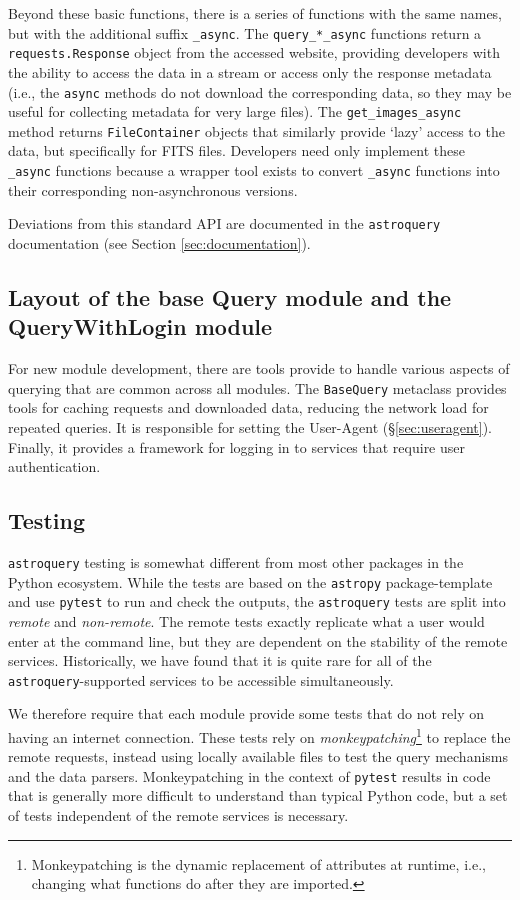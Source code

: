 \documentclass[twocolumn]{aastex61}
\newcommand{\package}[1]{\texttt{#1}\xspace}
\newcommand{\astroquery}{\package{astroquery}}
\newcommand{\astropypkg}{\package{astropy}}
\begin{document}
Beyond these basic functions, there is a series of functions with the same
names, but with the additional suffix \texttt{\_async}.  The
\texttt{query\_*\_async} functions return a \texttt{requests.Response} object
from the accessed website, providing developers with
the ability to access the data in a stream or access only the response
metadata (i.e., the \texttt{async} methods do not download the corresponding
data, so they may be useful for collecting metadata for very large files).  The
\texttt{get\_images\_async} method returns
\texttt{FileContainer} objects that similarly provide `lazy' access to the
data, but specifically for FITS files.  Developers need only implement
these \texttt{\_async} functions because a wrapper tool exists to convert
\texttt{\_async} functions into their corresponding non-asynchronous versions.

Deviations from this standard API are documented in the \astroquery
documentation (see Section \ref{sec:documentation}).

\subsection{Layout of the base Query module and the QueryWithLogin module}
For new module development, there are tools provide to handle various aspects
of querying that are common across all modules.  The \texttt{BaseQuery}
metaclass provides tools for caching requests and downloaded data, reducing the
network load for repeated queries.  It is responsible for setting the
User-Agent (\S \ref{sec:useragent}).  Finally, it provides a framework for
logging in to services that require user authentication.

\subsection{Testing}
\astroquery testing is somewhat different from most other packages in the Python
ecosystem.  While the tests are based on the \astropypkg package-template and use
\package{pytest} to run and check the outputs, the \astroquery tests are split into
\emph{remote} and \emph{non-remote}.  The remote tests exactly replicate what a user
would enter at the command line, but they are dependent on the stability of the
remote services.  Historically, we have found that it is quite rare for all of
the \astroquery-supported services to be accessible simultaneously.

We therefore require that each module provide some tests that do not rely on
having an internet connection.  These tests rely on
\emph{monkeypatching}\footnote{Monkeypatching is the dynamic replacement of
attributes at runtime, i.e., changing what functions do after they are
imported.} to
replace the remote requests, instead using locally available files to test the
query mechanisms and the data parsers.  Monkeypatching in the context of
\package{pytest} results in code that is generally more difficult to understand
than typical Python code, but a set of tests independent of the remote services
is necessary.
\end{document}

